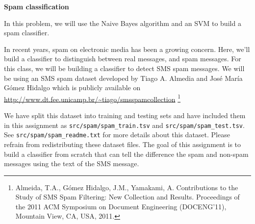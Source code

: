 \item {} {\bf Spam classification}

In this problem, we will use the Naive Bayes algorithm and an SVM to
build a spam classifier.

In recent years, spam on electronic media has been a growing concern.  Here, we'll build a classifier to distinguish
between real messages, and spam messages. For this class, we will be building a classifier to detect SMS spam messages. We will be using an SMS spam dataset developed by Tiago A. Almedia and José María Gómez Hidalgo which is publicly available on \url{http://www.dt.fee.unicamp.br/~tiago/smsspamcollection} \footnote{Almeida, T.A., Gómez Hidalgo, J.M., Yamakami, A. Contributions to the Study of SMS Spam Filtering: New Collection and Results.  Proceedings of the 2011 ACM Symposium on Document Engineering (DOCENG'11), Mountain View, CA, USA, 2011.}

We have split this dataset into training and testing sets and have included them in this assignment as \texttt{src/spam/spam\_train.tsv} and \texttt{src/spam/spam\_test.tsv}. See \texttt{src/spam/spam\_readme.txt} for more details about this dataset. Please refrain from redistributing these dataset files. The goal of this assignment is to build a classifier from scratch that can tell the difference the spam and non-spam messages using the text of the SMS message.

\begin{enumerate}
  
  \ifnum{} {
    
  } \fi

  
  \ifnum{} {
    
  } \fi

  
  \ifnum{} {
    
  } \fi

  
  \ifnum{} {
    
  } \fi
\end{enumerate}
